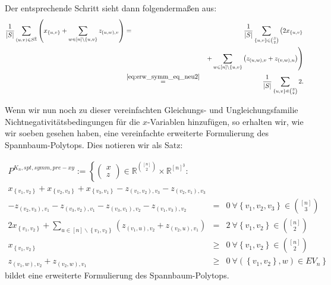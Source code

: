 \documentclass[10p,a4paper,BCOR = 12mm, DIV=15]{scrbook}
\begin{document}
{\begin{itemize}
Der entsprechende Schritt sieht dann folgendermaßen aus:
\begin{eqnarray*}
\frac{1}{\left|S\right|} \sum_{\left(u, v\right) \in S^{\underline{2}}} \left( x_{\left\{u, v\right\}} + \sum_{w \in \left[n\right] \backslash \left\{u, v\right\}} z_{\left(u, w\right), v} 
\right)
& = & 
\frac{1}{\left|S\right|} \sum_{\left\{u, v\right\} \in {S \choose 2}} \left(2 x_{\left\{u, v\right\}}\right. \\
& & \left.+ \sum_{w \in \left[n\right] \backslash \left\{u, v\right\}} \left(z_{\left(u, w\right), v} + z_{\left(v, w\right), u}\right)\right) \\
& \stackrel{\eqref{eq:erw_symm_eq_neu2}}{=} &
\frac{1}{\left|S\right|} \sum_{\left\{u, v\right\} \in {S \choose 2}} 2.
\end{eqnarray*}
\end{itemize}

Wenn wir nun noch zu dieser vereinfachten Gleichungs- und Ungleichungsfamilie Nichtnegativitätsbedingungen für die $x$-Variablen hinzufügen, so erhalten wir, wie wir soeben gesehen haben, eine vereinfachte erweiterte Formulierung des Spannbaum-Polytops. Dies notieren wir als Satz:

\begin{Sa}
\label{sa:pre_Pxy}
\begin{eqnarray*}
P^{K_n, spt, symm, pre-xy} := \left\{
\left(\begin{array}{c}
x \\
z
\end{array}\right)\in\mathbb{R}^{[n]\choose 2}\times \mathbb{R}^{[n]^{\underline{3}}}: \nonumber\right. & & \\
x_{\left\{v_1, v_2\right\}} + x_{\left\{v_2, v_3\right\}} + x_{\left\{v_3, v_1\right\}} 
- z_{\left(v_1, v_2\right), v_3} - z_{\left(v_2, v_1\right), v_3} & & \nonumber \\
- z_{\left(v_2, v_3\right), v_1} - z_{\left(v_3, v_2\right), v_1} 
- z_{\left(v_3, v_1\right), v_2} - z_{\left(v_1, v_3\right), v_2}
& = & 0\ \forall \left\{v_1, v_2, v_3\right\}\in {\left[n\right] \choose 3} \\
2 x_{\left\{v_1, v_2\right\}} + \sum_{u\in[n]\backslash\left\{v_1, v_2\right\}} \left(z_{\left(v_1, u\right), v_2} + z_{\left(v_2, u\right), v_1} \right) & = & 2\ \forall \left\{v_1, v_2\right\}\in {[n] \choose 2} \\
x_{\left\{v_1, v_2\right\}} & \geq & 0 \ \forall \left\{v_1, v_2\right\}\in {[n] \choose 2} \\
z_{\left(v_1, w\right), v_2}+z_{\left(v_2, w\right), v_1} & \geq & 0 \left. \ \forall \left(\left\{v_1, v_2\right\}, w\right) \in EV_n \nonumber \right\}
\end{eqnarray*}
bildet eine erweiterte Formulierung des Spannbaum-Polytops.
\end{Sa}

}
\end{document}
